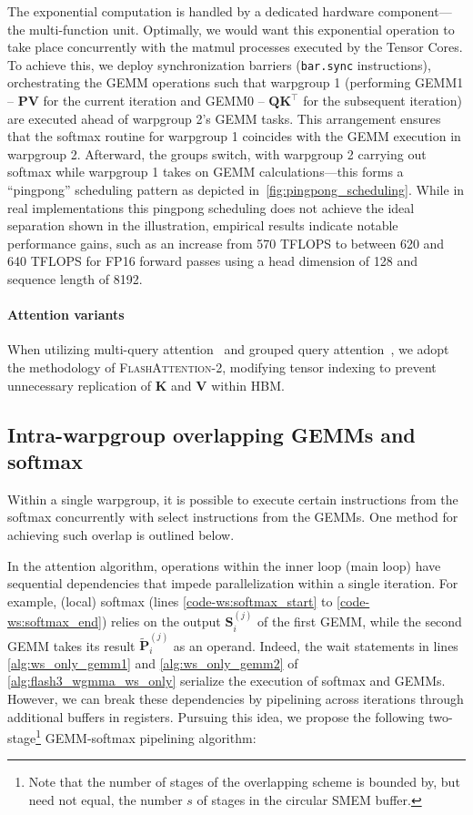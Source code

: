 The exponential computation is handled by a dedicated hardware component—the multi-function unit. Optimally, we would want this exponential operation to take place concurrently with the matmul processes executed by the Tensor Cores. To achieve this, we deploy synchronization barriers (\texttt{bar.sync} instructions), orchestrating the GEMM operations such that warpgroup 1 (performing GEMM1 -- $\mathbf{P} \mathbf{V}$ for the current iteration and GEMM0 -- $\mathbf{Q} \mathbf{K}^\top$ for the subsequent iteration) are executed ahead of warpgroup 2's GEMM tasks. This arrangement ensures that the softmax routine for warpgroup 1 coincides with the GEMM execution in warpgroup 2. Afterward, the groups switch, with warpgroup 2 carrying out softmax while warpgroup 1 takes on GEMM calculations—this forms a ``pingpong'' scheduling pattern as depicted in~\cref{fig:pingpong_scheduling}. While in real implementations this pingpong scheduling does not achieve the ideal separation shown in the illustration, empirical results indicate notable performance gains, such as an increase from 570 TFLOPS to between 620 and 640 TFLOPS for FP16 forward passes using a head dimension of 128 and sequence length of 8192.

\paragraph{Attention variants} When utilizing multi-query attention~\citep{shazeer2019fast} and grouped query attention~\citep{ainslie2023gqa}, we adopt the methodology of \textsc{FlashAttention-2}, modifying tensor indexing to prevent unnecessary replication of $\mathbf{K}$ and $\mathbf{V}$ within HBM.

\subsection{Intra-warpgroup overlapping GEMMs and softmax}

Within a single warpgroup, it is possible to execute certain instructions from the softmax concurrently with select instructions from the GEMMs. One method for achieving such overlap is outlined below.

In the attention algorithm, operations within the inner loop (main loop) have sequential dependencies that impede parallelization within a single iteration. For example, (local) softmax (lines \ref{code-ws:softmax_start} to \ref{code-ws:softmax_end}) relies on the output $\mathbf{S}_i^{(j)}$ of the first GEMM, while the second GEMM takes its result $\widetilde{\mathbf{P}}_i^{(j)}$ as an operand. Indeed, the wait statements in lines \ref{alg:ws_only_gemm1} and \ref{alg:ws_only_gemm2} of \cref{alg:flash3_wgmma_ws_only} serialize the execution of softmax and GEMMs. However, we can break these dependencies by pipelining across iterations through additional buffers in registers. Pursuing this idea, we propose the following two-stage\footnote{Note that the number of stages of the overlapping scheme is bounded by, but need not equal, the number $s$ of stages in the circular SMEM buffer.} GEMM-softmax pipelining algorithm:

